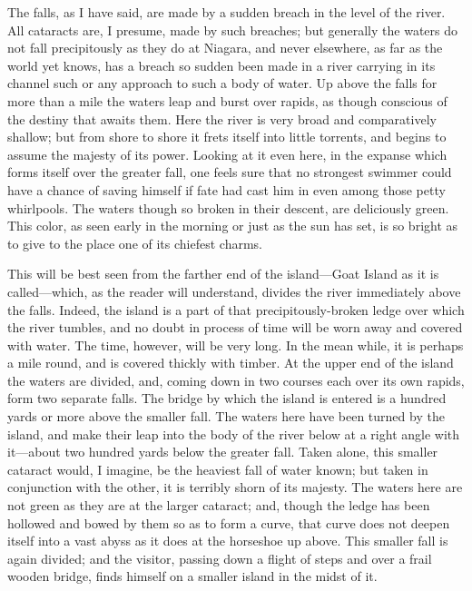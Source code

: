 The falls, as I have said, are made by a sudden breach in the level
of the river.  All cataracts are, I presume, made by such breaches;
but generally the waters do not fall precipitously as they do at
Niagara, and never elsewhere, as far as the world yet knows, has a
breach so sudden been made in a river carrying in its channel such
or any approach to such a body of water.  Up above the falls for
more than a mile the waters leap and burst over rapids, as though
conscious of the destiny that awaits them.  Here the river is very
broad and comparatively shallow; but from shore to shore it frets
itself into little torrents, and begins to assume the majesty of
its power.  Looking at it even here, in the expanse which forms
itself over the greater fall, one feels sure that no strongest
swimmer could have a chance of saving himself if fate had cast him
in even among those petty whirlpools.  The waters though so broken
in their descent, are deliciously green.  This color, as seen early
in the morning or just as the sun has set, is so bright as to give
to the place one of its chiefest charms.

This will be best seen from the farther end of the island---Goat
Island as it is called---which, as the reader will understand,
divides the river immediately above the falls.  Indeed, the island
is a part of that precipitously-broken ledge over which the river
tumbles, and no doubt in process of time will be worn away and
covered with water.  The time, however, will be very long.  In the
mean while, it is perhaps a mile round, and is covered thickly with
timber.  At the upper end of the island the waters are divided,
and, coming down in two courses each over its own rapids, form two
separate falls.  The bridge by which the island is entered is a
hundred yards or more above the smaller fall.  The waters here have
been turned by the island, and make their leap into the body of the
river below at a right angle with it---about two hundred yards below
the greater fall.  Taken alone, this smaller cataract would, I
imagine, be the heaviest fall of water known; but taken in
conjunction with the other, it is terribly shorn of its majesty.
The waters here are not green as they are at the larger cataract;
and, though the ledge has been hollowed and bowed by them so as to
form a curve, that curve does not deepen itself into a vast abyss
as it does at the horseshoe up above.  This smaller fall is again
divided; and the visitor, passing down a flight of steps and over a
frail wooden bridge, finds himself on a smaller island in the midst
of it.

